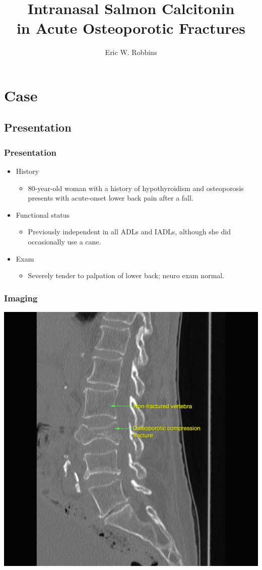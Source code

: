 \documentclass{beamer}
\title{Intranasal Salmon Calcitonin \\ in Acute Osteoporotic Fractures}
\author{Eric W. Robbins}
\date{}
\begin{document}
	\begin{frame}
		\titlepage
	\end{frame}
	\begin{frame}
		\tableofcontents
	\end{frame}
\section{Case}
\subsection{Presentation}
	\begin{frame}
		\frametitle{Presentation}
			\begin{itemize}
				\item History
				\begin{itemize}
					\item 80-year-old woman with a history of hypothyroidism and osteoporosis presents with acute-onset lower back pain after a fall.
				\end{itemize}		
			\item Functional status
				\begin{itemize}
					\item Previously independent in all ADLs and IADLs, although she did occasionally use a cane.
				\end{itemize}
			\item Exam
				\begin{itemize}
					\item Severely tender to palpation of lower back; neuro exam normal.
				\end{itemize}
			\end{itemize}
			\end{frame}
	\begin{frame}
		\frametitle{Imaging}
		\centering
		\includegraphics[width=1.0\textwidth,keepaspectratio]{media/compression-fx.jpg}
	\end{frame}
\end{document}
